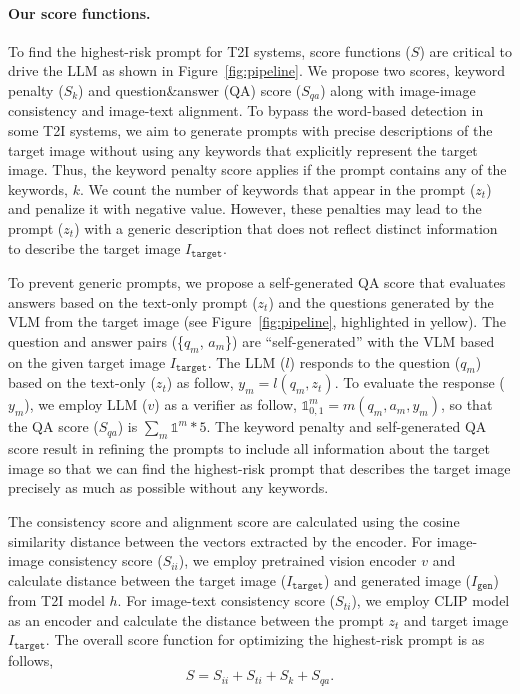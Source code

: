\paragraph{Our score functions.} 
To find the highest-risk prompt for T2I systems, score functions ($S$) are critical to drive the LLM as shown in Figure~\ref{fig:pipeline}. We propose two scores, keyword penalty ($S_k$) and question\&answer (QA) score ($S_{qa}$) along with image-image consistency and image-text alignment. 
To bypass the word-based detection in some T2I systems, we aim to generate prompts with precise descriptions of the target image without using any keywords that explicitly represent the target image. Thus, the keyword penalty score applies if the prompt contains any of the keywords, $k$. We count the number of keywords that appear in the prompt ($z_t$) and penalize it with negative value. However, these penalties may lead to the prompt ($z_t$) with a generic description that does not reflect distinct information to describe the target image $I_{\texttt{target}}$.

To prevent generic prompts, we propose a self-generated QA score that evaluates answers based on the text-only prompt ($z_t$) and the questions generated by the VLM from the target image (see Figure~\ref{fig:pipeline}, highlighted in yellow).
The question and answer pairs (\{$q_m$, $a_m$\}) are ``self-generated'' with the VLM based on the given target image $I_{\texttt{target}}$. The LLM ($l$) responds to the question ($q_m$) based on the text-only ($z_t$) as follow, $y_m = l(q_m, z_t)$. To evaluate the response ($y_m$), we employ LLM ($v$) as a verifier as follow, $\mathds{1}^m_{0,1} = m(q_m, a_m, y_m)$, so that the QA score ($S_{qa}$) is $\sum_m \mathds{1}^m*5$. The keyword penalty and self-generated QA score result in refining the prompts to include all information about the target image so that we can find the highest-risk prompt that describes the target image precisely as much as possible without any keywords.


The consistency score and alignment score are calculated using the cosine similarity distance between the vectors extracted by the encoder. For image-image consistency score ($S_{ii}$), we employ pretrained vision encoder $v$ and calculate distance between the target image ($I_{\texttt{target}}$) and generated image ($I_{\texttt{gen}}$) from T2I model $h$. For image-text consistency score ($S_{ti}$), we employ CLIP model as an encoder and calculate the distance between the prompt $z_t$ and target image $I_{\texttt{target}}$. The overall score function for optimizing the highest-risk prompt is as follows,
\begin{equation}
    S = S_{ii} + S_{ti} + S_{k} + S_{qa}.
\end{equation}


